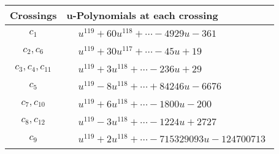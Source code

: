 \documentclass[1p]{elsarticle_modified}
\theoremstyle{definition}
\begin{document}
\begin{tabular}{m{50pt}|m{274pt}}
Crossings & \hspace{64pt}u-Polynomials at each crossing \\
\hline $$\begin{aligned}c_{1}\end{aligned}$$&$\begin{aligned}
&u^{119}+60 u^{118}+\cdots-4929 u-361
\end{aligned}$\\
\hline $$\begin{aligned}c_{2},c_{6}\end{aligned}$$&$\begin{aligned}
&u^{119}+30 u^{117}+\cdots-45 u+19
\end{aligned}$\\
\hline $$\begin{aligned}c_{3},c_{4},c_{11}\end{aligned}$$&$\begin{aligned}
&u^{119}+3 u^{118}+\cdots-236 u+29
\end{aligned}$\\
\hline $$\begin{aligned}c_{5}\end{aligned}$$&$\begin{aligned}
&u^{119}-8 u^{118}+\cdots+84246 u-6676
\end{aligned}$\\
\hline $$\begin{aligned}c_{7},c_{10}\end{aligned}$$&$\begin{aligned}
&u^{119}+6 u^{118}+\cdots-1800 u-200
\end{aligned}$\\
\hline $$\begin{aligned}c_{8},c_{12}\end{aligned}$$&$\begin{aligned}
&u^{119}-3 u^{118}+\cdots-1224 u+2727
\end{aligned}$\\
\hline $$\begin{aligned}c_{9}\end{aligned}$$&$\begin{aligned}
&u^{119}+2 u^{118}+\cdots-715329093 u-124700713
\end{aligned}$\\
\hline
\end{tabular}\\~\\
\end{document}
